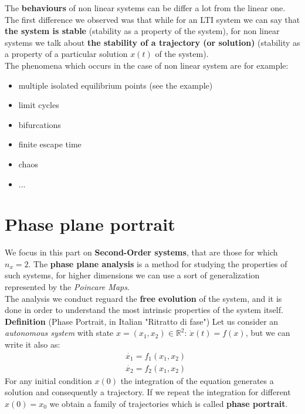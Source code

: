 
The \textbf{behaviours} of non linear systems can be differ a lot from the linear one. The first difference we observed was that while for an LTI system we can say that \textbf{the system is stable} (stability as a property of the system), for non linear systems we talk about \textbf{the stability of a trajectory (or solution)} (stability as a property of a particular solution $x(t)$ of the system). \\
The phenomena which occurs in the case of non linear system are for example: \begin{itemize}
    \setlength\itemsep {0em}
    \item multiple isolated equilibrium points (see the example)
    \item limit cycles
    \item bifurcations
    \item finite escape time
    \item chaos
    \item ...
\end{itemize}

\section{Phase plane portrait}
We focus in this part on \textbf{Second-Order systems}, that are those for which $n_x=2$. The \textbf{phase plane analysis} is a method for studying the properties of such systems, for higher dimensions we can use a sort of generalization represented by the \textit{Poincare Maps}.\\
The analysis we conduct reguard the \textbf{free evolution} of the system, and it is done in order to understand the most intrinsic properties of the system itself.   \\

\noindent
\textbf{Definition} (Phase Portrait, in Italian "Ritratto di fase") Let us consider an \textit{autonomous system} with state $x=(x_1, x_2)\in\mathbb{R}^2$: $\dot{x}(t)=f(x)$, but we can write it also as: 
\begin{align*}
    &\dot{x_1}=f_1(x_1, x_2)   \\
    &\dot{x_2}=f_2(x_1, x_2)
\end{align*}
For any initial condition $x(0)$ the integration of the equation generates a solution and consequently a trajectory. If we repeat the integration for different $x(0)=x_0$ we obtain a family of trajectories which is called {\color{red} \textbf{phase portrait}}.\\

